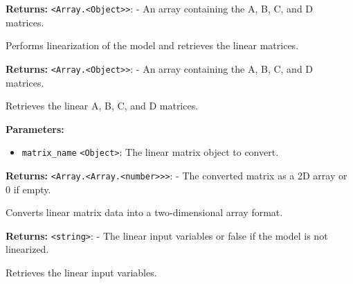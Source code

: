 \documentclass[12pt,a4paper]{article}
\begin{document}
\vspace{5mm}
\noindent {}


\noindent \textbf{Returns:} \texttt{<Array.<Object>>}: - An array containing the A, B, C, and D matrices.

\noindent Performs linearization of the model and retrieves the linear matrices.

\vspace{5mm}
\noindent {}


\noindent \textbf{Returns:} \texttt{<Array.<Object>>}: - An array containing the A, B, C, and D matrices.

\noindent Retrieves the linear A, B, C, and D matrices.

\vspace{5mm}
\noindent {}


\noindent \textbf{Parameters:}
\begin{itemize}
  \item \texttt{matrix\_name} \texttt{<Object>}: The linear matrix object to convert.
\end{itemize}

\noindent \textbf{Returns:} \texttt{<Array.<Array.<number>>>}: - The converted matrix as a 2D array or 0 if empty.

\noindent Converts linear matrix data into a two-dimensional array format.

\vspace{5mm}
\noindent {}


\noindent \textbf{Returns:} \texttt{<string>}: - The linear input variables or false if the model is not linearized.

\noindent Retrieves the linear input variables.

\vspace{5mm}
\noindent {}
\end{document}
